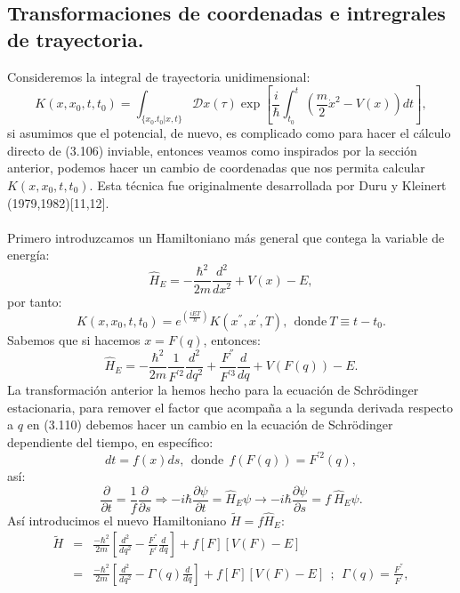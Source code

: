 \subsection{Transformaciones de coordenadas e intregrales de trayectoria.}
Consideremos la integral de trayectoria unidimensional:
\begin{equation}
K(x,x_{0},t,t_{0})=\int_{\{x_{0}.t_{0}|x,t\}}\mathcal{D}x(\tau)\exp\left[\frac{i}{\hbar}\int_{t_{0}}^{t}\left(\frac{m}{2}\dot{x}^{2}-V(x)\right)dt\right] ,
\end{equation}
si asumimos que el potencial, de nuevo, es complicado como para hacer el cálculo directo de (3.106) inviable, entonces veamos como inspirados por la sección anterior, podemos hacer un cambio de coordenadas que nos permita calcular $K(x,x_{0},t,t_{0})$. Esta técnica fue originalmente desarrollada por Duru y Kleinert (1979,1982)[11,12].
\\
\\
Primero introduzcamos un Hamiltoniano más general que contega la variable de energía:
\begin{equation}
\hat{H}_{E}=-\frac{\hbar^{2}}{2m}\frac{d^{2}}{dx^{2}}+V(x)-E,
\end{equation}
por tanto:
\begin{equation}
K(x,x_{0},t,t_{0})=e^{ \left(\frac{iET}{\hbar}\right)}K(x^{''},x^{'},T),\ \  \text{donde}\ T\equiv t-t_0. 
\end{equation}
Sabemos que si hacemos $x=F(q)$, entonces:
\begin{equation}
\hat{H}_{E}=-\frac{\hbar^{2}}{2m}\frac{1}{F^{'2}}\frac{d^{2}}{dq^{2}}+\frac{F^{''}}{F^{'3}}\frac{d}{dq}+V(F(q))-E.
\end{equation} 
La transformación anterior la hemos hecho para la ecuación de Schrödinger estacionaria, para remover el factor que acompaña a la segunda derivada respecto a $q$ en (3.110) debemos hacer un cambio en la ecuación de Schrödinger dependiente del tiempo, en específico:
\begin{equation}
dt=f(x)ds,\ \ \text{donde}\ \ f(F(q))=F^{'2}(q),
\end{equation}
así:
\begin{equation}
\frac{\partial}{\partial t}=\frac{1}{f}\frac{\partial}{\partial s}\Rightarrow-i\hbar\frac{\partial\psi}{\partial t}=\hat{H}_{E}\psi\to-i\hbar\frac{\partial\psi}{\partial s}=f\ \hat{H}_{E}\psi .
\end{equation}
Así introducimos el nuevo Hamiltoniano $\tilde{H}=f\hat{H}_E$:
\begin{eqnarray}
\nonumber \tilde{H}&=&\frac{-\hbar^{2}}{2m}\left[\frac{d^{2}}{dq^{2}}-\frac{F^{''}}{F^{'}}\frac{d}{dq}\right]+f[F]\left[V(F)-E\right]\\
&=& \frac{-\hbar^{2}}{2m}\left[\frac{d^{2}}{dq^{2}}-\Gamma(q)\frac{d}{dq}\right]+f[F]\left[V(F)-E\right]\ \ ;\ \ \Gamma(q)=\frac{F^{''}}{F^{'}},
\end{eqnarray}
